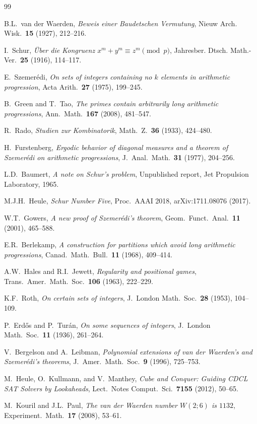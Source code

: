 \documentclass[12pt,a4paper]{amsart}
\theoremstyle{definition}
\begin{document}
\begin{thebibliography}{99}

B.L.\ van der Waerden,
\emph{Beweis einer Baudetschen Vermutung},
Nieuw Arch. Wisk.\ \textbf{15} (1927), 212--216.

I.\ Schur,
\emph{\"{U}ber die Kongruenz $x^m + y^m \equiv z^m \pmod{p}$},
Jahresber. Dtsch. Math.-Ver.\ \textbf{25} (1916), 114--117.

E.\ Szemer\'edi,
\emph{On sets of integers containing no $k$ elements in arithmetic progression},
Acta Arith.\ \textbf{27} (1975), 199--245.

B.\ Green and T.\ Tao,
\emph{The primes contain arbitrarily long arithmetic progressions},
Ann.\ Math.\ \textbf{167} (2008), 481--547.

R.\ Rado,
\emph{Studien zur Kombinatorik},
Math.\ Z.\ \textbf{36} (1933), 424--480.

H.\ Furstenberg,
\emph{Ergodic behavior of diagonal measures and a theorem of Szemer\'edi on arithmetic progressions},
J.\ Anal.\ Math.\ \textbf{31} (1977), 204--256.

L.D.\ Baumert,
\emph{A note on Schur's problem},
Unpublished report, Jet Propulsion Laboratory, 1965.

M.J.H.\ Heule,
\emph{Schur Number Five},
Proc.\ AAAI 2018, arXiv:1711.08076 (2017).

W.T.\ Gowers,
\emph{A new proof of Szemer\'edi's theorem},
Geom.\ Funct.\ Anal.\ \textbf{11} (2001), 465--588.

E.R.\ Berlekamp,
\emph{A construction for partitions which avoid long arithmetic progressions},
Canad.\ Math.\ Bull.\ \textbf{11} (1968), 409--414.

A.W.\ Hales and R.I.\ Jewett,
\emph{Regularity and positional games},
Trans.\ Amer.\ Math.\ Soc.\ \textbf{106} (1963), 222--229.

K.F.\ Roth,
\emph{On certain sets of integers},
J.\ London Math.\ Soc.\ \textbf{28} (1953), 104--109.

P.\ Erd\H{o}s and P.\ Tur\'an,
\emph{On some sequences of integers},
J.\ London Math.\ Soc.\ \textbf{11} (1936), 261--264.

V.\ Bergelson and A.\ Leibman,
\emph{Polynomial extensions of van der Waerden's and Szemer\'edi's theorems},
J.\ Amer.\ Math.\ Soc.\ \textbf{9} (1996), 725--753.

M.\ Heule, O.\ Kullmann, and V.\ Manthey,
\emph{Cube and Conquer: Guiding CDCL SAT Solvers by Lookaheads},
Lect.\ Notes Comput.\ Sci.\ \textbf{7155} (2012), 50--65.

M.\ Kouril and J.L.\ Paul,
\emph{The van der Waerden number $W(2;6)$ is $1132$},
Experiment.\ Math.\ \textbf{17} (2008), 53--61.

\end{thebibliography}
\end{document}
